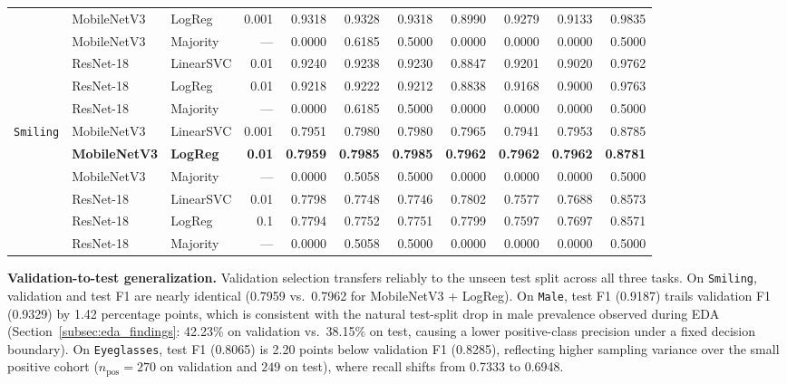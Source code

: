 \documentclass[12pt,a4paper]{article}
\newcommand{\code}[1]{\texttt{#1}}
\begin{document}
\begin{table}[H]
\begin{tabular}{@{}l l l r r r r r r r r@{}}
      & MobileNetV3 & LogReg    & 0.001 & 0.9318 & 0.9328 & 0.9318 & 0.8990 & 0.9279 & 0.9133 & 0.9835 \\
      & MobileNetV3 & Majority  & ---   & 0.0000 & 0.6185 & 0.5000 & 0.0000 & 0.0000 & 0.0000 & 0.5000 \\
      & ResNet-18   & LinearSVC & 0.01  & 0.9240 & 0.9238 & 0.9230 & 0.8847 & 0.9201 & 0.9020 & 0.9762 \\
      & ResNet-18   & LogReg    & 0.01  & 0.9218 & 0.9222 & 0.9212 & 0.8838 & 0.9168 & 0.9000 & 0.9763 \\
      & ResNet-18   & Majority  & ---   & 0.0000 & 0.6185 & 0.5000 & 0.0000 & 0.0000 & 0.0000 & 0.5000 \\
    \midrule
    \multirow{6}{*}{\code{Smiling}}
      & MobileNetV3 & LinearSVC & 0.001 & 0.7951 & 0.7980 & 0.7980 & 0.7965 & 0.7941 & 0.7953 & 0.8785 \\
      & \textbf{MobileNetV3} & \textbf{LogReg} & \textbf{0.01} & \textbf{0.7959} & \textbf{0.7985} & \textbf{0.7985} & \textbf{0.7962} & \textbf{0.7962} & \textbf{0.7962} & \textbf{0.8781} \\
      & MobileNetV3 & Majority  & ---   & 0.0000 & 0.5058 & 0.5000 & 0.0000 & 0.0000 & 0.0000 & 0.5000 \\
      & ResNet-18   & LinearSVC & 0.01  & 0.7798 & 0.7748 & 0.7746 & 0.7802 & 0.7577 & 0.7688 & 0.8573 \\
      & ResNet-18   & LogReg    & 0.1   & 0.7794 & 0.7752 & 0.7751 & 0.7799 & 0.7597 & 0.7697 & 0.8571 \\
      & ResNet-18   & Majority  & ---   & 0.0000 & 0.5058 & 0.5000 & 0.0000 & 0.0000 & 0.0000 & 0.5000 \\
    \bottomrule
  \end{tabular}
\end{table}

\textbf{Validation-to-test generalization.} Validation selection transfers reliably to the unseen test split across all three tasks. On \code{Smiling}, validation and test F1 are nearly identical (0.7959 vs.\ 0.7962 for MobileNetV3 + LogReg). On \code{Male}, test F1 (0.9187) trails validation F1 (0.9329) by 1.42 percentage points, which is consistent with the natural test-split drop in male prevalence observed during EDA (Section~\ref{subsec:eda_findings}: 42.23\% on validation vs.\ 38.15\% on test, causing a lower positive-class precision under a fixed decision boundary). On \code{Eyeglasses}, test F1 (0.8065) is 2.20 points below validation F1 (0.8285), reflecting higher sampling variance over the small positive cohort ($n_{\text{pos}} = 270$ on validation and $249$ on test), where recall shifts from 0.7333 to 0.6948.
\end{document}
